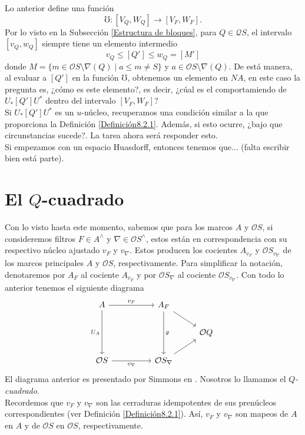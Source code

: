 Lo anterior define una función 
\[
\mho\colon [V_Q, W_Q]\to [V_F, W_F].
\]
Por lo visto en la Subsección \ref{Estructura de bloques}, para $Q\in \mathcal{Q}S$, el intervalo $[v_Q, w_Q]$ siempre tiene un elemento intermedio
\[
v_Q\leq [Q']\leq w_Q=[M']
\]
donde $M=\{m\in \mathcal{O}S\setminus \nabla(Q)\mid a\leq m\neq S\}$ y $a\in \mathcal{O}S\setminus \nabla(Q)$. De está manera, al evaluar a $[Q']$ en la función $\mho$, obtenemos
un elemento en $NA$, en este caso la pregunta es, ¿cómo es este elemento?, es decir, ¿cúal es el comportamiendo de $U_*[Q']U^*$ dentro del intervalo $[V_F, W_F]$?\\

Si $U_*[Q']U^*$ es un $u$-núcleo, recuperamos una condición similar a la que proporciona la Definición \ref{Definición8.2.1}. Además, si esto ocurre, ¿bajo que circunstancias 
sucede?. La tarea ahora será responder esto.\\

Si empezamos con un espacio Huasdorff, entonces tenemos que... (falta escribir bien está parte).

\section{El $Q$-cuadrado}\label{Qcuadrado}

Con lo visto hasta este momento, sabemos que para los marcos $A$ y $\mathcal{O}S$, si consideremos filtros $F\in A^\wedge$ y $\nabla\in \mathcal{O}S^\wedge$, estos están en correspondencia con su respectivo núcleo ajustado
$v_F$ y $v_\nabla$. Estos producen los cocientes $A_{v_F}$ y $\mathcal{O}S_{v_\nabla}$ de los marcos principales $A$ y $\mathcal{O}S$, respectivamente. Para simplificar la notación, denotaremos por $A_F$ al cociente $A_{v_F}$ 
y por $\mathcal{O}S_\nabla$ al cociente $\mathcal{O}S_{v_\nabla}$. Con todo lo anterior tenemos el siguiente diagrama
\[
\begin{tikzcd}
	A && {A_F} \\
	&&& {\mathcal{O}Q} \\
	{\mathcal{O}S} && {\mathcal{O}S_\nabla}
	\arrow["{v_F}", from=1-1, to=1-3]
	\arrow["{U_A}"', from=1-1, to=3-1]
	\arrow[from=1-3, to=2-4]
	\arrow["g", from=1-3, to=3-3]
	\arrow["{v_\nabla}"', from=3-1, to=3-3]
	\arrow[from=3-3, to=2-4]
\end{tikzcd}
\]
El diagrama anterior es presentado por Simmons en \cite{H.S.V}. Nosotros lo llamamos el \emph{$Q$-cuadrado}.\\

Recordemos que $v_F$ y $v_\nabla$ son las cerraduras idempotentes de sus prenúcleos correspondientes (ver Definición \ref{Definición8.2.1}). Así, $v_F$ y $v_\nabla$ son mapeos de $A$ en $A$ y de $\mathcal{O}S$ en $\mathcal{O}S$, respectivamente.\\

